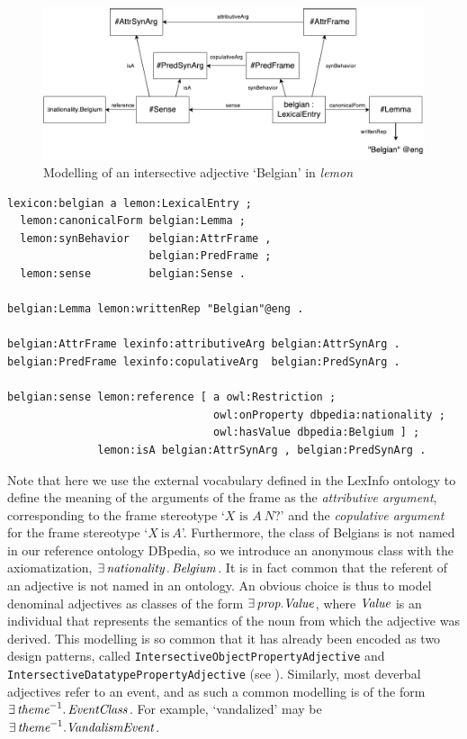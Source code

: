 \documentclass[11pt]{article}
\begin{document}
\begin{figure}
\includegraphics[width=\textwidth]{belgian-example}
\caption{Modelling of an intersective adjective `Belgian' in \emph{lemon}\label{example-belgian}}
\end{figure}

\begin{small}\begin{verbatim}
lexicon:belgian a lemon:LexicalEntry ;
  lemon:canonicalForm belgian:Lemma ;
  lemon:synBehavior   belgian:AttrFrame , 
                      belgian:PredFrame ;
  lemon:sense         belgian:Sense .

belgian:Lemma lemon:writtenRep "Belgian"@eng .

belgian:AttrFrame lexinfo:attributiveArg belgian:AttrSynArg .
belgian:PredFrame lexinfo:copulativeArg  belgian:PredSynArg .

belgian:sense lemon:reference [ a owl:Restriction ;
                                owl:onProperty dbpedia:nationality ;
                                owl:hasValue dbpedia:Belgium ] ;
              lemon:isA belgian:AttrSynArg , belgian:PredSynArg .
\end{verbatim}\end{small}

Note that here we use the external vocabulary defined in the LexInfo ontology \cite{cimiano2011lexinfo} 
to define the meaning of the arguments of the frame as the \emph{attributive 
argument}, corresponding to the frame stereotype `$X\text{ is }A~N?$' and the 
\emph{copulative argument} for the frame stereotype `$X\mathrm{~is~}A$'. Furthermore,
the class of Belgians is not named in our reference ontology DBpedia, so we 
introduce an anonymous class with the axiomatization, 
$\exists\,\text{\em nationality}\,.\,\text{\em Belgium}$. It is in fact common that the 
referent of an adjective is not named in an ontology. An obvious choice is thus to model denominal adjectives as classes of the form $\exists\,\text{\em prop}.\text{\em Value}$, 
where $\text{\em Value}$ is an individual that represents the semantics of the noun from which the adjective was derived. This modelling is so common that it has already been encoded as two
design patterns, called {\tt IntersectiveObjectPropertyAdjective} and {\tt
IntersectiveDatatypePropertyAdjective} (see \cite{mccrae2014design}).
Similarly, most deverbal adjectives refer to an event, and as such
a common modelling is of the form $\exists\,\text{\em theme}^{-1}. \,\text{\em EventClass}$.
For example, `vandalized' may be $\exists\,\text{\em theme}^{-1}.\text{\em VandalismEvent}$.
\end{document}
